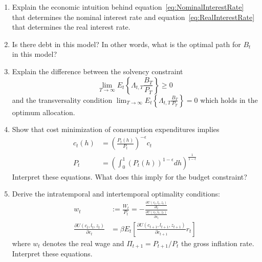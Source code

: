 \begin{enumerate}
\item Explain the economic intuition behind equation~\eqref{eq:NominalInterestRate} that determines the nominal interest rate
  and equation~\eqref{eq:RealInterestRate} that determines the real interest rate.

\item Is there debt in this model? In other words, what is the optimal path for \(B_t\) in this model?

\item Explain the difference between the solvency constraint
\begin{equation*}
\lim_{T \rightarrow \infty} E_t{\left \{ \Lambda_{t,T} \frac{B_T}{P_T} \right \}} \geq 0
\end{equation*}
and the transversality condition \(\lim_{T \rightarrow \infty} E_t \left \{ \Lambda_{t,T} \frac{B_T}{P_T} \right \} = 0\) which holds in the optimum allocation.

\item Show that cost minimization of consumption expenditures implies
\begin{align*}
c_t(h) &= {\left(\frac{P_t(h)}{P_t}\right)}^{-\epsilon} c_t
\\
P_t &= {\left(\int_0^1 {(P_t(h))}^{1-\epsilon}dh\right)}^{\frac{1}{1-\epsilon}}
\end{align*}
Interpret these equations. What does this imply for the budget constraint?

\item Derive the intratemporal and intertemporal optimality conditions:
\begin{align*}
w_t &:= \frac{W_t}{P_t} = - \frac{\frac{\partial U(c_t,l_t,z_t)}{\partial l_t}}{\frac{\partial U(c_t,l_t,z_t)}{\partial c_t}}
\\
\frac{\partial U(c_t,l_t,z_t)}{\partial c_t} &= \beta E_t \left[\frac{\partial U(c_{t+1},l_{t+1},z_{t+1})}{\partial c_{t+1}} r_t \right]
\end{align*}
where \(w_t\) denotes the real wage and \(\Pi_{t+1} = P_{t+1}/P_t\) the gross inflation rate. Interpret these equations.
\end{enumerate}

